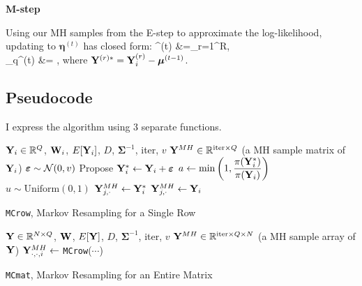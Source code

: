 \documentclass{template}
\begin{document}
\noindent\textbf{M-step}

Using our MH samples from the E-step to approximate the log-likelihood, updating to  $\boldsymbol{\eta}^{(t)}$ has closed form:
\bal 
\boldsymbol{\Sigma}^{(t)} &=\sum_{r=1}^{R},\\
\boldsymbol{\mu}_{q}^{(t)} &= \onen\sumi {},
\eal 
where $\mathbf{Y}^{(r)*}=\mathbf{Y}_i^{(r)}-\boldsymbol{\mu}^{(t-1)}$.


\subsection{Pseudocode}

 I express the algorithm using 3 separate functions.


\FloatBarrier 
\begin{algorithm}[ht!]
\begin{algorithmic}[1]
\Input $\mathbf{Y}_i\in\mathbb{R}^{Q}$, $\mathbf{W}_i$, $E[\mathbf{Y}_i]$, $D$, $\boldsymbol{\Sigma}^{-1}$, iter, $v$
\Output $\mathbf{Y}^{MH}\in\mathbb{R}^{\text{iter}\times Q}$ (a MH sample matrix of $\mathbf{Y}_i$)
\State $\boldsymbol{\varepsilon} \sim \mathcal{N}(0,v)$
\State Propose $\mathbf{Y}_i^* \gets \mathbf{Y}_i+\boldsymbol{\varepsilon}$
\State $a \gets \min\left(1,\dfrac{\pi(\mathbf{Y}_i^*)}{\pi(\mathbf{Y}_i)}\right)$
\State $u \sim \text{Uniform}(0,1)$
\State $\mathbf{Y}^{MH}_{j,\cdot} \gets \mathbf{Y}_i^*$
\Else 
\State $\mathbf{Y}^{MH}_{j,\cdot} \gets \mathbf{Y}_i$
\EndIf
\EndFor
{}
\end{algorithmic}
\caption{\texttt{MCrow}, Markov Resampling for a Single Row}
\end{algorithm}


\begin{algorithm}[ht!]
\begin{algorithmic}[1]
\Input $\mathbf{Y}\in\mathbb{R}^{N\times Q}$, $\mathbf{W}$, $E[\mathbf{Y}]$, $D$, $\boldsymbol{\Sigma}^{-1}$, iter, $v$
\Output $\mathbf{Y}^{MH}\in\mathbb{R}^{\text{iter}\times Q\times N}$ (a MH sample array of $\mathbf{Y}$)
\State $\mathbf{Y}^{MH}_{\cdot,\cdot,i} \gets$ \texttt{MCrow}($\cdots$)
\EndFor
{}
\end{algorithmic}
\caption{\texttt{MCmat}, Markov Resampling for an Entire Matrix}
\end{algorithm}
\end{document}
